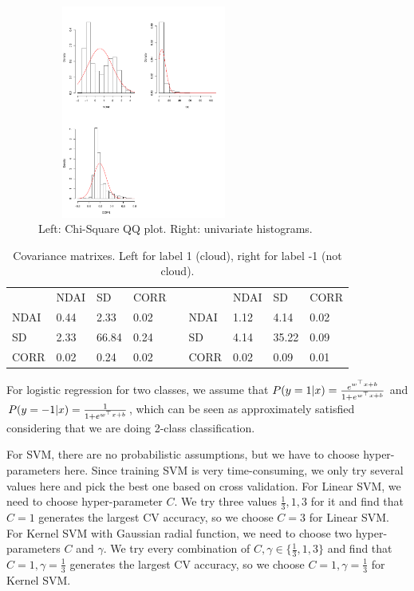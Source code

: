\documentclass[11pt]{article}
\begin{document}
\begin{enumerate}[label=(\alph*)]
\begin{enumerate}
\begin{figure}[h]
		\includegraphics[width = 7cm, height = 7cm]{Figure/hist}
		\caption{Left: Chi-Square QQ plot. Right: univariate histograms.}
		\label{MVNtest}
	\end{figure}



\begin{table}[h!]
\centering
\begin{tabular}{|l|l|l|l|l|l|l|l|l|}
\cline{1-4} \cline{6-9}
     & NDAI & SD    & CORR &  &      & NDAI & SD    & CORR \\ \cline{1-4} \cline{6-9} 
NDAI & 0.44 & 2.33  & 0.02 &  & NDAI & 1.12 & 4.14  & 0.02 \\ \cline{1-4} \cline{6-9} 
SD   & 2.33 & 66.84 & 0.24 &  & SD   & 4.14 & 35.22 & 0.09 \\ \cline{1-4} \cline{6-9}
CORR & 0.02 & 0.24  & 0.02 &  & CORR & 0.02 & 0.09  & 0.01 \\ \cline{1-4} \cline{6-9} 
\end{tabular}
\caption{Covariance matrixes. Left for label 1 (cloud), right for label -1 (not cloud).}
\label{tabCovarianceMatrix}
\end{table}


	\par
	For logistic regression for two classes, we assume that $P(y=1|x) = \frac{e^{w^\top x+b}}{1+e^{w^\top x + b}}$ and $P(y=-1|x) = \frac{1}{1+e^{w^\top x + b}}$, which can be seen as approximately satisfied considering that we are doing 2-class classification. \par
	For SVM, there are no probabilistic assumptions, but we have to choose hyper-parameters here. Since training SVM is very time-consuming, we only try several values here and pick the best one based on cross validation. For Linear SVM,  we need to choose hyper-parameter $C$. We try three values $\frac{1}{3},1,3$ for it and find that $C=1$ generates the largest CV accuracy, so we choose $C=3$ for Linear SVM. For Kernel SVM with Gaussian radial function, we need to choose two hyper-parameters $C$ and $\gamma$. We try every combination of $C,\gamma\in\{\frac{1}{3},1,3\}$ and find that $C=1,\gamma=\frac{1}{3}$ generates the largest CV accuracy, so we choose $C=1,\gamma=\frac{1}{3}$ for Kernel SVM. 


\end{enumerate}
\end{enumerate}
\end{document}
